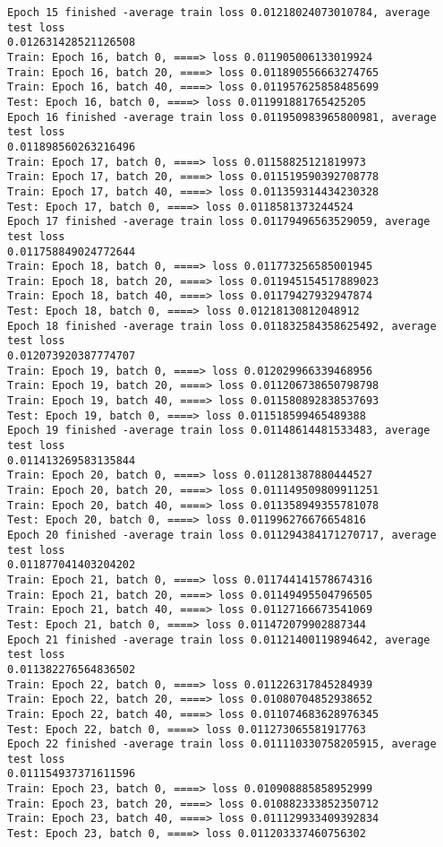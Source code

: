 \documentclass[11pt]{article}
\begin{document}
\begin{Verbatim}[commandchars=\\\{\}]
Epoch 15 finished -average train loss 0.01218024073010784, average test loss
0.012631428521126508
Train: Epoch 16, batch 0, ====> loss 0.011905006133019924
Train: Epoch 16, batch 20, ====> loss 0.011890556663274765
Train: Epoch 16, batch 40, ====> loss 0.011957625858485699
Test: Epoch 16, batch 0, ====> loss 0.011991881765425205
Epoch 16 finished -average train loss 0.011950983965800981, average test loss
0.011898560263216496
Train: Epoch 17, batch 0, ====> loss 0.01158825121819973
Train: Epoch 17, batch 20, ====> loss 0.011519590392708778
Train: Epoch 17, batch 40, ====> loss 0.011359314434230328
Test: Epoch 17, batch 0, ====> loss 0.0118581373244524
Epoch 17 finished -average train loss 0.01179496563529059, average test loss
0.011758849024772644
Train: Epoch 18, batch 0, ====> loss 0.011773256585001945
Train: Epoch 18, batch 20, ====> loss 0.011945154517889023
Train: Epoch 18, batch 40, ====> loss 0.01179427932947874
Test: Epoch 18, batch 0, ====> loss 0.01218130812048912
Epoch 18 finished -average train loss 0.011832584358625492, average test loss
0.012073920387774707
Train: Epoch 19, batch 0, ====> loss 0.012029966339468956
Train: Epoch 19, batch 20, ====> loss 0.011206738650798798
Train: Epoch 19, batch 40, ====> loss 0.011580892838537693
Test: Epoch 19, batch 0, ====> loss 0.011518599465489388
Epoch 19 finished -average train loss 0.01148614481533483, average test loss
0.011413269583135844
Train: Epoch 20, batch 0, ====> loss 0.011281387880444527
Train: Epoch 20, batch 20, ====> loss 0.011149509809911251
Train: Epoch 20, batch 40, ====> loss 0.011358949355781078
Test: Epoch 20, batch 0, ====> loss 0.011996276676654816
Epoch 20 finished -average train loss 0.011294384171270717, average test loss
0.011877041403204202
Train: Epoch 21, batch 0, ====> loss 0.011744141578674316
Train: Epoch 21, batch 20, ====> loss 0.01149495504796505
Train: Epoch 21, batch 40, ====> loss 0.01127166673541069
Test: Epoch 21, batch 0, ====> loss 0.011472079902887344
Epoch 21 finished -average train loss 0.01121400119894642, average test loss
0.011382276564836502
Train: Epoch 22, batch 0, ====> loss 0.011226317845284939
Train: Epoch 22, batch 20, ====> loss 0.01080704852938652
Train: Epoch 22, batch 40, ====> loss 0.011074683628976345
Test: Epoch 22, batch 0, ====> loss 0.011273065581917763
Epoch 22 finished -average train loss 0.011110330758205915, average test loss
0.011154937371611596
Train: Epoch 23, batch 0, ====> loss 0.010908885858952999
Train: Epoch 23, batch 20, ====> loss 0.010882333852350712
Train: Epoch 23, batch 40, ====> loss 0.011129933409392834
Test: Epoch 23, batch 0, ====> loss 0.011203337460756302

\end{Verbatim}
\end{document}

